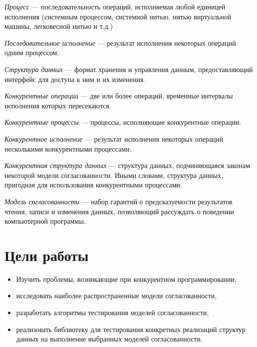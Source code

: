 \documentclass[14pt, openany]{book}
\begin{document}
\emph{Процесс} --- последовательность операций, исполняемая любой единицей исполнения (системным процессом, системной нитью, нитью виртуальной машины, легковесной нитью и т.д.)

\emph{Последовательное исполнение} --- результат исполнения некоторых операций одним процессом.

\emph{Структура данных} --- формат хранения и управления данным, предоставляющий интерфейс для доступа к ним и их изменения.

\emph{Конкурентные операции} --- две или более операций, временные интервалы исполнения которых пересекаются.

\emph{Конкурентные процессы} --- процессы, исполняющие конкурентные операции.

\emph{Конкурентное исполнение} --- результат исполнения некоторых операций несколькими конкурентными процессами.

\emph{Конкурентная структура данных} --- структура данных, подчиняющаяся законам некоторой модели согласованности. Иными словами, структура данных, пригодная для использования конкурентными процессами. 

\emph{Модель согласованности} --- набор гарантий о предсказуемости результатов чтения, записи и изменения данных, позволяющий рассуждать о поведении компьютерной программы.

\section{Цели работы}

\begin{itemize}
  \item Изучить проблемы, возникающие при конкурентном программировании,
  \item исследовать наиболее распространенные модели согласованности,
  \item разработать алгоритмы тестирования моделей согласованности,
  \item реализовать библиотеку для тестирования конкретных реализаций структур данных на выполнение выбранных моделей согласованности.
\end{itemize}
\end{document}
